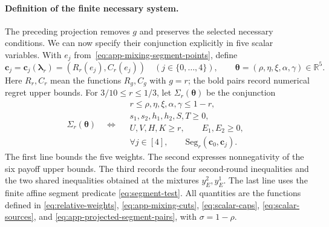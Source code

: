 \documentclass[11pt]{article}
\theoremstyle{remark}
\theoremstyle{plain}
\begin{document}
\paragraph{Definition of the finite necessary system.}
The preceding projection removes $g$ and preserves the selected
necessary conditions. We can now specify their conjunction
explicitly in five scalar variables.
With $e_j$ from~\eqref{eq:app-mixing-segment-points}, define
\begin{equation}
 \boldsymbol c_j=\boldsymbol c_j(\boldsymbol\lambda_r)
       =(R_r(e_j),C_r(e_j))
       \quad(j\in\{0,\ldots,4\}),\qquad
 \boldsymbol\theta=(\rho,\eta,\xi,\alpha,\gamma)\in\mathbb R^5.
 \label{eq:app-projected-segment-pairs}
\end{equation}
Here $R_r,C_r$ mean the functions $R_g,C_g$ with $g=r$;
the bold pairs record numerical regret upper bounds.
For $3/10\le r\le1/3$, let $\Sigma_r(\boldsymbol\theta)$ be
the conjunction
\begin{equation}
 \Sigma_r(\boldsymbol\theta)
 \quad\Longleftrightarrow\quad
 \begin{gathered}
 r\le\rho,\eta,\xi,\alpha,\gamma\le1-r,\\
 s_1,s_2,h_1,h_2,S,T\ge0,\\
 U,V,H,K\ge r,\qquad E_1,E_2\ge0,\\
 \forall j\in[4],\qquad
 \mathrm{Seg}_r(\boldsymbol c_0,\boldsymbol c_j).
 \end{gathered}
 \label{eq:scalar-system}
\end{equation}
The first line bounds the five weights. The second expresses
nonnegativity of the six payoff upper bounds. The third records
the four second-round inequalities and the two shared inequalities
obtained at the mixtures $y_E^2,y_E^1$.
The last line uses the finite affine segment predicate
\eqref{eq:segment-test}.
All quantities are the functions defined in
\eqref{eq:relative-weights}, \eqref{eq:app-mixing-cuts},
\eqref{eq:scalar-caps}, \eqref{eq:scalar-sources}, and
\eqref{eq:app-projected-segment-pairs}, with $\sigma=1-\rho$.
\end{document}

